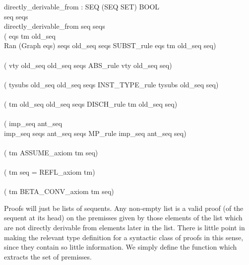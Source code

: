 \documentclass[a4paper,11pt,titlepage]{article}
\begin{document}
\begin{titlepage}
\begin{HOLConst}
\+	\PrNL{}directly\_derivable\_from\PrNN{} : SEQ \MMM{\rightarrow} (SEQ SET) \MMM{\rightarrow} BOOL\\
\PrPH{}
\+	\MMM{\forall} seq seqs \MMM{\bullet}\\
\+	directly\_derivable\_from seq seqs \MMM{\Leftrightarrow}\\
\+	(\MMM{\exists} eqs tm old\_seq \MMM{\bullet}\\
\+	Ran (Graph eqs) \MMM{\subseteq} seqs \MMM{\land} old\_seq \MMM{\in} seqs \MMM{\land} SUBST\_rule eqs tm old\_seq seq)\\
\+	\MMM{\lor}\\
\+	(\MMM{\exists} vty old\_seq \MMM{\bullet} old\_seq \MMM{\in} seqs \MMM{\land} ABS\_rule vty old\_seq seq)\\
\+	\MMM{\lor}\\
\+	(\MMM{\exists} tysubs old\_seq \MMM{\bullet} old\_seq \MMM{\in} seqs \MMM{\land} INST\_TYPE\_rule tysubs old\_seq seq)\\
\+	\MMM{\lor}\\
\+	(\MMM{\exists} tm old\_seq \MMM{\bullet} old\_seq \MMM{\in} seqs \MMM{\land} DISCH\_rule tm old\_seq seq)\\
\+	\MMM{\lor}\\
\+	(\MMM{\exists} imp\_seq ant\_seq \MMM{\bullet}\\
\+	imp\_seq \MMM{\in} seqs \MMM{\land} ant\_seq \MMM{\in} seqs \MMM{\land} MP\_rule imp\_seq ant\_seq seq)\\
\+	\MMM{\lor}\\
\+	(\MMM{\exists} tm \MMM{\bullet} ASSUME\_axiom tm seq)\\
\+	\MMM{\lor}\\
\+	(\MMM{\exists} tm \MMM{\bullet} seq = REFL\_axiom tm)\\
\+	\MMM{\lor}\\
\+	(\MMM{\exists} tm \MMM{\bullet} BETA\_CONV\_axiom tm seq)\\
\end{HOLConst}

Proofs will just be lists of sequents. Any non-empty
list is a valid proof (of the sequent at its
head) on the premisses given by those elements
of the list which are not directly derivable
from elements later in the list.
There is little point in making the relevant type
definition for a syntactic class of proofs in this sense,
since they contain so little information.
We simply define the function which extracts the set
of premisses.


\end{titlepage}
\end{document}
